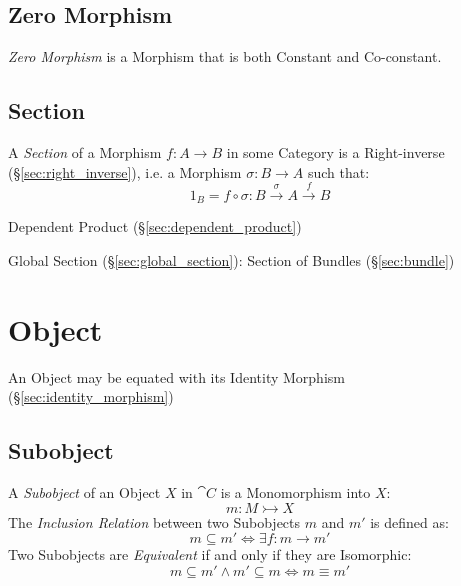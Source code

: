 \subsection{Zero Morphism}\label{sec:zero_morphism}

\emph{Zero Morphism} is a Morphism that is both Constant and
Co-constant.



\subsection{Section}\label{sec:section}

A \emph{Section} of a Morphism $f : A \rightarrow B$ in some Category
is a Right-inverse (\S\ref{sec:right_inverse}), i.e. a Morphism
$\sigma : B \rightarrow A$ such that:
\[
  1_B = f \circ \sigma : B \xrightarrow{\sigma} A \xrightarrow{f} B
\]

Dependent Product (\S\ref{sec:dependent_product})

Global Section (\S\ref{sec:global_section}): Section of Bundles
(\S\ref{sec:bundle})



\section{Object}\label{sec:category_object}

An Object may be equated with its Identity Morphism
(\S\ref{sec:identity_morphism})



\subsection{Subobject}\label{sec:subobject}

A \emph{Subobject} of an Object $X$ in $\cat{C}$ is a Monomorphism
into $X$:
\[
  m : M \rightarrowtail X
\]
The \emph{Inclusion Relation} between two Subobjects $m$ and $m'$ is
defined as:
\[
  m \subseteq m' \Leftrightarrow \exists f : m \rightarrow m'
\]
Two Subobjects are \emph{Equivalent} if and only if they are
Isomorphic:
\[
  m \subseteq m' \wedge m' \subseteq m \Leftrightarrow m \equiv m'
\]

